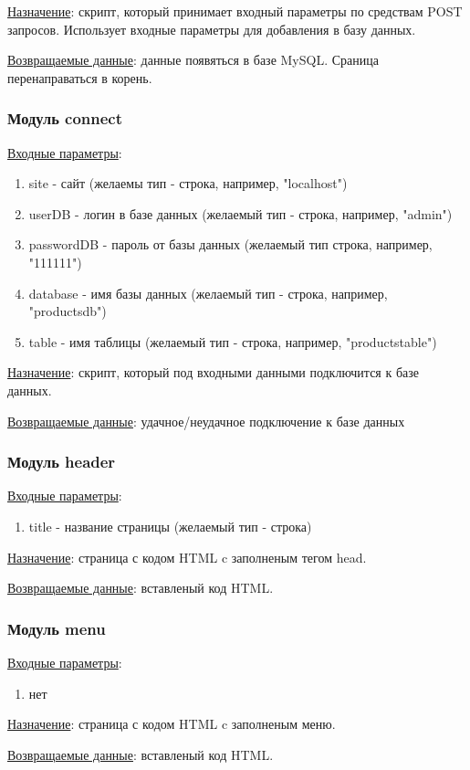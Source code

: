 \underline{Назначение}: скрипт, который принимает входный параметры по средствам POST запросов. Использует входные параметры для добавления в базу данных.

\underline{Возвращаемые данные}: данные появяться в базе MySQL. Сраница перенаправаться в корень.


\subsubsection*{Модуль connect}

\underline{Входные параметры}:

\begin{enumerate}
    \item site - сайт (желаемы тип - строка, например,  "localhost")
    \item userDB - логин в базе данных (желаемый тип - строка, например, "admin")
    \item passwordDB - пароль от базы данных (желаемый тип строка, например, "111111")
    \item database - имя базы данных (желаемый тип - строка, например, "productsdb")
    \item table - имя таблицы (желаемый тип - строка, например, "productstable")
\end{enumerate}

\underline{Назначение}: скрипт, который под входными данными подключится к базе данных.

\underline{Возвращаемые данные}: удачное/неудачное подключение к базе данных


\subsubsection*{Модуль header}

\underline{Входные параметры}:

\begin{enumerate}
    \item title - название страницы (желаемый тип - строка)
\end{enumerate}

\underline{Назначение}: страница с кодом HTML c заполненым тегом head.

\underline{Возвращаемые данные}: вставленый код HTML.


\subsubsection*{Модуль menu}

\underline{Входные параметры}:

\begin{enumerate}
    \item нет
\end{enumerate}

\underline{Назначение}: страница с кодом HTML c заполненым меню.

\underline{Возвращаемые данные}: вставленый код HTML.


\newpage